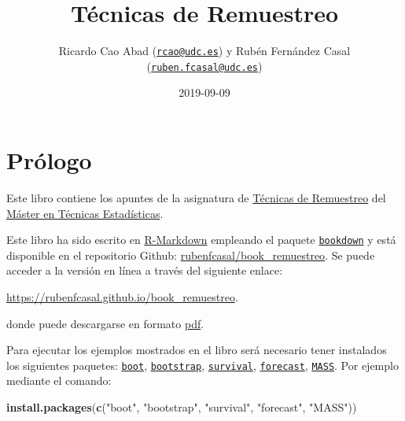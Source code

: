 \documentclass[]{book}
\title{Técnicas de Remuestreo}
\author{Ricardo Cao Abad (\href{mailto:rcao@udc.es}{\nolinkurl{rcao@udc.es}}) y
Rubén Fernández Casal
(\href{mailto:ruben.fcasal@udc.es}{\nolinkurl{ruben.fcasal@udc.es}})}
\date{2019-09-09}
\newenvironment{Shaded}{\begin{snugshade}}{\end{snugshade}}
\newcommand{\KeywordTok}[1]{\textcolor[rgb]{0.13,0.29,0.53}{\textbf{#1}}}
\newcommand{\StringTok}[1]{\textcolor[rgb]{0.31,0.60,0.02}{#1}}
\newcommand{\NormalTok}[1]{#1}
\theoremstyle{definition}
\theoremstyle{definition}
\theoremstyle{definition}
\theoremstyle{remark}
\begin{document}
\maketitle

{
\setcounter{tocdepth}{1}
\tableofcontents
}
\chapter*{Prólogo}\label{prologo}

Este libro contiene los apuntes de la asignatura de
\href{http://eamo.usc.es/pub/mte/index.php/es/?option=com_content\&view=article\&id=2202\&idm=22\&a\%C3\%B1o=2019}{Técnicas
de Remuestreo} del \href{http://eio.usc.es/pub/mte}{Máster en Técnicas
Estadísticas}.

Este libro ha sido escrito en
\href{http://rmarkdown.rstudio.com}{R-Markdown} empleando el paquete
\href{https://bookdown.org/yihui/bookdown/}{\texttt{bookdown}} y está
disponible en el repositorio Github:
\href{https://github.com/rubenfcasal/book_remuestreo}{rubenfcasal/book\_remuestreo}.
Se puede acceder a la versión en línea a través del siguiente enlace:

\url{https://rubenfcasal.github.io/book_remuestreo}.

donde puede descargarse en formato
\href{https://rubenfcasal.github.io/book_remuestreo/book_remuestreo.pdf}{pdf}.

Para ejecutar los ejemplos mostrados en el libro será necesario tener
instalados los siguientes paquetes:
\href{https://cran.r-project.org/web/packages/boot/index.html}{\texttt{boot}},
\href{https://cran.r-project.org/web/packages/bootstrap/index.html}{\texttt{bootstrap}},
\href{https://cran.r-project.org/web/packages/survival/index.html}{\texttt{survival}},
\href{https://cran.r-project.org/web/packages/forecast/index.html}{\texttt{forecast}},
\href{https://cran.r-project.org/web/packages/MASS/index.html}{\texttt{MASS}}.
Por ejemplo mediante el comando:

\begin{Shaded}
\begin{Highlighting}[]
\KeywordTok{install.packages}\NormalTok{(}\KeywordTok{c}\NormalTok{(}\StringTok{"boot"}\NormalTok{, }\StringTok{"bootstrap"}\NormalTok{, }\StringTok{"survival"}\NormalTok{, }\StringTok{"forecast"}\NormalTok{, }\StringTok{"MASS"}\NormalTok{))}
\end{Highlighting}
\end{Shaded}
\end{document}
